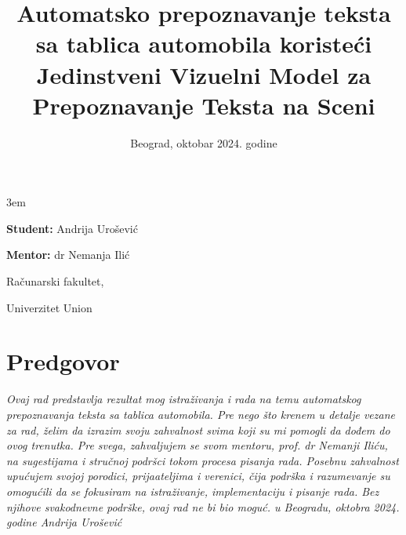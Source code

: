 \documentclass[a4paper,12pt]{article}
\title{Automatsko prepoznavanje teksta sa tablica \todo[color=green!40]{Da li je bolje koristiti termin vozila, jer je opstiji od automobila?}automobila koristeći Jedinstveni Vizuelni Model za Prepoznavanje Teksta na Sceni}
\date{}
\begin{document}
	\emergencystretch 3em
	\begin{titlepage}
		\centering
		{\huge\bfseries \maketitle}
		
		{\large
			\textbf{Student:}
			Andrija Urošević
			\par
			\bigskip
			\textbf{Mentor:}
			dr Nemanja Ilić
		}
	
		\vfill
		{\large Računarski fakultet,\par}
		{\large Univerzitet Union\par}
		\bigskip
		\date{Beograd, oktobar 2024. godine}
	\end{titlepage}
	
	
	\section*{Predgovor}
	\noindent
	\textit{Ovaj rad predstavlja rezultat mog istraživanja i rada na temu automatskog prepoznavanja teksta sa tablica automobila. Pre nego što krenem u detalje vezane za rad, želim da izrazim svoju zahvalnost svima koji su mi pomogli da dođem do ovog trenutka.
	\newline
	\newline
	Pre svega, zahvaljujem se svom mentoru, prof. dr Nemanji Iliću, na sugestijama i stručnoj podršci tokom procesa pisanja rada.
	\newline
	\newline
	Posebnu zahvalnost upućujem svojoj porodici, prijaateljima i verenici, čija podrška i razumevanje su omogućili da se fokusiram na istraživanje, implementaciju i pisanje rada. Bez njihove svakodnevne podrške, ovaj rad ne bi bio moguć.
	\newline
	\newline	
	u Beogradu, oktobra 2024. godine
	\newline
	Andrija Urošević}
	\newpage
	
	\tableofcontents
	\newpage
	
	
\end{document}
